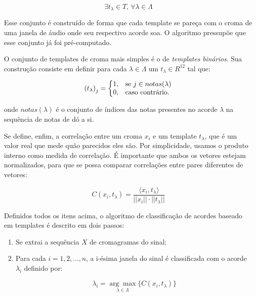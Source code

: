     \[
      \exists t_\lambda \in T \textrm{, } \forall \lambda \in \Lambda
    \]
    
    Esse conjunto é construído de forma que cada template se pareça com o croma de uma janela de áudio onde seu respectivo acorde soa. O algoritmo pressupõe que esse conjunto já foi pré-computado.
    
    O conjunto de templates de croma mais simples é o de \textit{templates binários}. Sua construção consiste em definir para cada $\lambda \in \Lambda$ um $t_\lambda \in R^{12}$ tal que:
    
    \[
        {(t_\lambda)}_j = \left\{
            \begin{array}{@{}ll@{}}
                1, & \textrm{se}\ j \in notas(\lambda) \\
                0, & \textrm{caso contrário.}
            \end{array}\right.
    \]
    
    onde $notas(\lambda)$ é o conjunto de índices das notas presentes no acorde $\lambda$ na sequência de notas de dó a si.
    
    Se define, enfim, a correlação entre um croma $x_i$ e um template $t_\lambda$, que é um valor real que mede quão parecidos eles são. Por simplicidade, usamos o produto interno como medida de correlação. É importante que ambos os vetores estejam normalizados, para que se possa comparar correlações entre pares diferentes de vetores:
    
    \[
        C(x_i, t_\lambda) =
            \frac{\langle x_i, t_\lambda \rangle}{||x_i|| \cdot ||t_\lambda||}
    \]
    
    Definidos todos os itens acima, o algoritmo de classificação de acordes baseado em templates é descrito em dois passos:

    \begin{enumerate}
        \item Se extrai a sequência $X$ de cromagramas do sinal;
        \item Para cada $i = 1, 2, \dots, n$, a i-ésima janela do sinal       é classificada com o acorde $\lambda_i$ definido por:
        
        \[
            \lambda_i = \underset{\lambda \in \Lambda}{\arg \max}\{C(x_i, t_\lambda)\}
        \]
        
    \end{enumerate}

